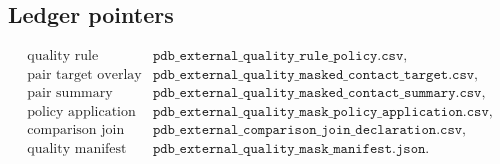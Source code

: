 \subsection{Ledger pointers}

\[
\begin{array}{ll}
\text{quality rule} & \texttt{pdb\_external\_quality\_rule\_policy.csv},\\
\text{pair target overlay} & \texttt{pdb\_external\_quality\_masked\_contact\_target.csv},\\
\text{pair summary} & \texttt{pdb\_external\_quality\_masked\_contact\_summary.csv},\\
\text{policy application} & \texttt{pdb\_external\_quality\_mask\_policy\_application.csv},\\
\text{comparison join} & \texttt{pdb\_external\_comparison\_join\_declaration.csv},\\
\text{quality manifest} & \texttt{pdb\_external\_quality\_mask\_manifest.json}.
\end{array}
\]
